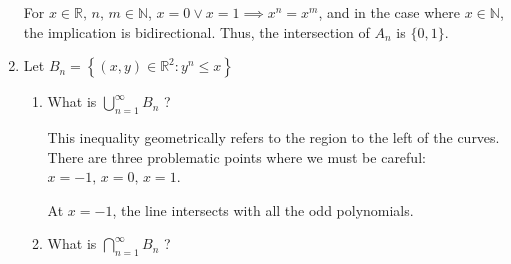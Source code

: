 \documentclass{article}
\newcommand{\R}{\mathbb{R}}
\newcommand{\N}{\mathbb{N}}
\begin{document}
\begin{enumerate}
        For $x \in \R,\, n,\, m \in \N$, $x = 0 \lor x = 1 \implies x^n = x^m$, and in
        the case where $x \in \N$, the implication is bidirectional. Thus, the
        intersection of $A_n$ is $\{0, 1\}$.

    \item Let $B_n = \left\{ (x, y) \in \R^2: y^n \leq x \right\}$

        \begin{enumerate}
            \item What is $\bigcup_{n=1}^\infty B_n$ ?

                This inequality geometrically refers to the region to the left of the
                curves. There are three problematic points where we must be careful:
                $x=-1,\, x=0,\, x=1$. 
                
                At $x=-1$, the line intersects with all the odd
                polynomials. 

            \item What is $\bigcap_{n=1}^\infty B_n$ ?
        \end{enumerate}
\end{enumerate}
\end{document}
